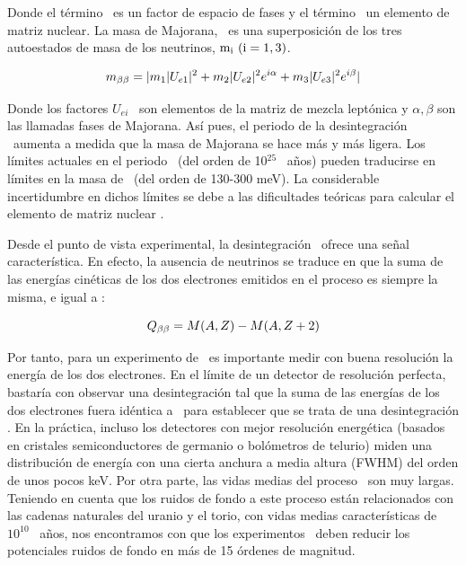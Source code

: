 Donde el término \Gonu\ es un factor de espacio de fases y el término \Monu\ un elemento de matriz nuclear. La masa  de Majorana, \mbb\ es una superposición de los tres autoestados de masa de los neutrinos, ${\rm m_i ~(i=1,3)} $. 
                                    
\begin{equation}
m_{\beta\beta} =|m_1 |U_{e1}|^2 + m_2 |U_{e2}|^2 e^{i\alpha}+ m_3 |U_{e3}|^2 e^{i\beta}|
\label{eq.mbb}
\end{equation}

Donde los factores $U_{ei}$~ son elementos de la matriz de mezcla leptónica y $\alpha,\beta$ son las llamadas fases de Majorana. Así pues, el periodo de la desintegración \bbonu\ aumenta a medida que la masa de Majorana se hace más y más ligera. Los límites actuales en el periodo \Tonu\  (del orden de 10$^{25}$~ años) pueden traducirse en límites en la masa de \mbb\ (del orden de 130-300 meV). La considerable incertidumbre en dichos límites se debe a las dificultades teóricas para calcular el elemento de matriz nuclear \Monu.  

Desde el punto de vista experimental, la desintegración \bbonu\ ofrece una señal característica. En efecto, la ausencia de neutrinos se traduce en que la suma de las energías cinéticas de los dos electrones emitidos en el proceso es siempre la misma, e igual a \Qbb: 
                                    
\begin{equation}
Q_{\beta\beta} =M(A,Z) - M(A, Z+2)
\label{eq.mbb}
\end{equation}

Por tanto, para un experimento de \bbonu\ es importante medir con buena resolución  la energía de los dos electrones. En el límite de un detector de resolución perfecta, bastaría con observar una desintegración tal que la suma de las energías de los dos electrones fuera idéntica a \Qbb\  para establecer que se trata de una desintegración \bbonu. En la práctica, incluso los detectores con mejor resolución energética (basados en cristales semiconductores de germanio o bolómetros de telurio) miden una distribución de energía con una cierta anchura a media altura (FWHM) del orden de unos pocos keV. Por otra parte, las vidas medias del proceso \bbonu\ son muy largas. Teniendo en cuenta que los ruidos de fondo a este proceso están relacionados con las cadenas naturales del uranio y el torio, con vidas medias características de $10^{10}$~ años, nos encontramos con que los experimentos \bbonu\ deben reducir los potenciales ruidos de fondo en más de 15 órdenes de magnitud. 

